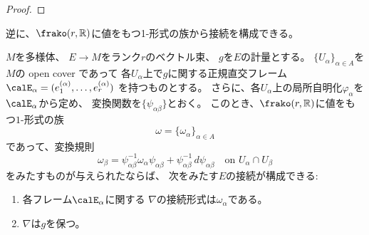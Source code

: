 \documentclass[report]{jlreq}
\begin{document}
\begin{proof}
    \TODO{}
\end{proof}

逆に、$\frako(r, \R)$に値をもつ1-形式の族から接続を構成できる。

\begin{proposition}[接続形式から定まる接続]
    $M$を多様体、
    $E \to M$をランク$r$のベクトル束、
    $g$を$E$の計量とする。
    $\{ U_\alpha \}_{\alpha \in A}$を$M$の open cover であって
    各$U_\alpha$上で$g$に関する正規直交フレーム
    $\calE_\alpha = (e^{(\alpha)}_1, \dots, e^{(\alpha)}_r)$
    を持つものとする。
    さらに、各$U_\alpha$上の局所自明化$\varphi_\alpha$を
    $\calE_\alpha$から定め、
    変換関数を$\{ \psi_{\alpha\beta} \}$とおく。
    このとき、$\frako(r, \R)$に値をもつ$1$-形式の族
    \begin{equation}
        \omega = \{ \omega_\alpha \}_{\alpha \in A}
    \end{equation}
    であって、変換規則
    \begin{equation}
        \omega_\beta
            = \psi_{\alpha\beta}^{-1} \omega_\alpha \psi_{\alpha\beta}
            + \psi_{\alpha\beta}^{-1} \, d \psi_{\alpha\beta}
            \quad
            \text{on $U_\alpha \cap U_\beta$}
    \end{equation}
    をみたすものが与えられたならば、
    次をみたす$E$の接続が構成できる:
    \begin{enumerate}
        \item 各フレーム$\calE_\alpha$に関する
            $\nabla$の接続形式は$\omega_\alpha$である。
        \item $\nabla$は$g$を保つ。
    \end{enumerate}
\end{proposition}
\end{document}
